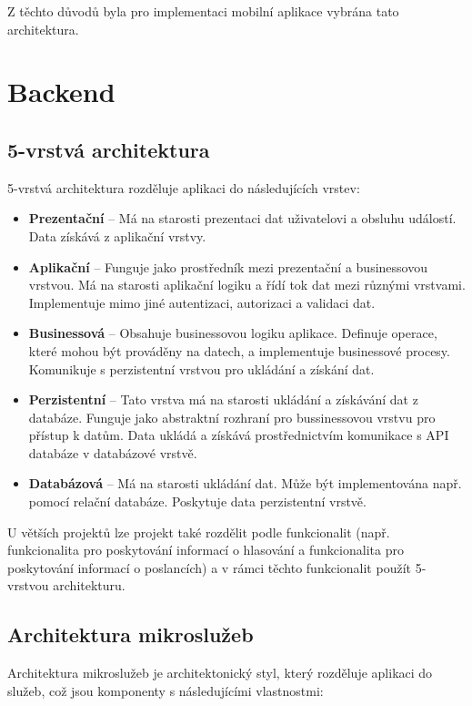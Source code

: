 \noindent Z těchto důvodů byla pro implementaci mobilní aplikace vybrána tato architektura. 

\section{Backend}

\subsection{5-vrstvá architektura}
5-vrstvá architektura \cite{5-tier} rozděluje aplikaci do následujících vrstev:


\begin{itemize}
	\item \textbf{Prezentační} -- Má na starosti prezentaci dat uživatelovi a obsluhu událostí. Data získává \linebreak z aplikační vrstvy.
	
	\item \textbf{Aplikační} -- Funguje jako prostředník mezi prezentační a businessovou vrstvou. Má na starosti aplikační logiku a řídí tok dat mezi různými vrstvami. Implementuje mimo jiné autentizaci, autorizaci a validaci dat.
	
	\item \textbf{Businessová} -- Obsahuje businessovou logiku aplikace. Definuje operace, které mohou být prováděny na datech, a implementuje businessové procesy. Komunikuje s perzistentní vrstvou pro ukládání a získání dat.	
	
	\item \textbf{Perzistentní} -- Tato vrstva má na starosti ukládání a získávání dat z databáze. Funguje jako abstraktní rozhraní pro bussinessovou vrstvu pro přístup k datům. Data ukládá a získává prostřednictvím komunikace s API databáze v databázové vrstvě.
	
	\item \textbf{Databázová} -- Má na starosti ukládání dat. Může být implementována např. pomocí relační databáze. Poskytuje data perzistentní vrstvě.
	
\end{itemize}

\noindent U větších projektů lze projekt také rozdělit podle funkcionalit (např. funkcionalita pro poskytování informací o hlasování a funkcionalita pro poskytování informací o poslancích) a v rámci těchto funkcionalit použít 5-vrstvou architekturu.

\subsection{Architektura mikroslužeb}
Architektura mikroslužeb je architektonický styl, který rozděluje aplikaci do služeb, což jsou komponenty s následujícími vlastnostmi:

